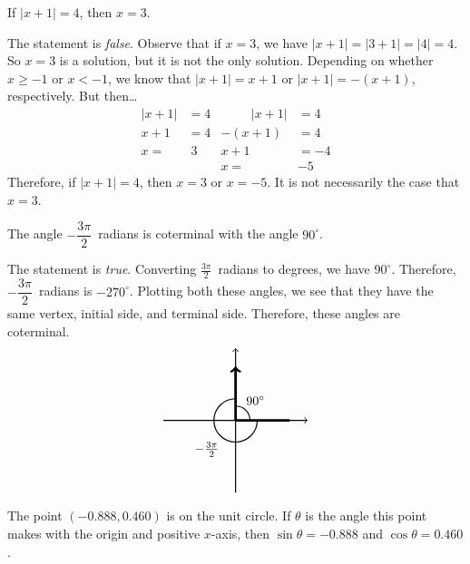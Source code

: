 \documentclass[11pt,letterpaper]{article}
\begin{document}
 If $|x + 1|= 4$, then $x= 3$. \pspace

\sol The statement is \textit{false}. Observe that if $x= 3$, we have $|x + 1|= |3 + 1|= |4|= 4$. So $x= 3$ is a solution, but it is not the only solution. Depending on whether $x \geq -1$ or $x < -1$, we know that $|x + 1|= x + 1$ or $|x + 1|= -(x + 1)$, respectively. But then\dots
	\[
	\begin{aligned}
	|x + 1|&= 4 &\hspace{1cm} |x + 1|&= 4 \\
	x + 1&= 4 & -(x + 1)&= 4 \\
	x= &\; 3 & x + 1&= -4 \\
	& & x= &-5
	\end{aligned}
	\]
Therefore, if $|x + 1|= 4$, then $x= 3$ or $x= -5$. It is not necessarily the case that $x= 3$. \pvspace{1.3cm}



 The angle $-\dfrac{3\pi}{2}$~radians is coterminal with the angle $90^\circ$. \pspace

\sol The statement is \textit{true}. Converting $\frac{3\pi}{2}$~radians to degrees, we have $90^\circ$. Therefore, $-\dfrac{3\pi}{2}$~radians is $-270^\circ$. Plotting both these angles, we see that they have the same vertex, initial side, and terminal side. Therefore, these angles are coterminal. 
	\[
	\begin{tikzpicture}
	\draw[line width=0.03cm,->] (-2,0) -- (2,0);				%
	\draw[line width=0.03cm,->] (0,-2) -- (0,2);				%
	
	\draw[line width=0.07cm,->] (0,0) -- (0,1.5);			%
	\draw[line width=0.07cm] (0,0) -- (1.5,0);				%
	
	\draw[line width=0.03cm] (0.4,0) arc (0:90:0.4); \node at (0.55,0.55) {$90^\circ$};	%
	\draw[line width=0.03cm] (0.6,0) arc (0:-270:0.6); \node at (-0.8,-0.8) {$-\frac{3\pi}{2}$};	%
	\end{tikzpicture}
	\]



\newpage



 The point $(-0.888,0.460)$ is on the unit circle. If $\theta$ is the angle this point makes with the origin and positive $x$-axis, then $\sin \theta= -0.888$ and $\cos \theta= 0.460$. \pspace
\end{document}
